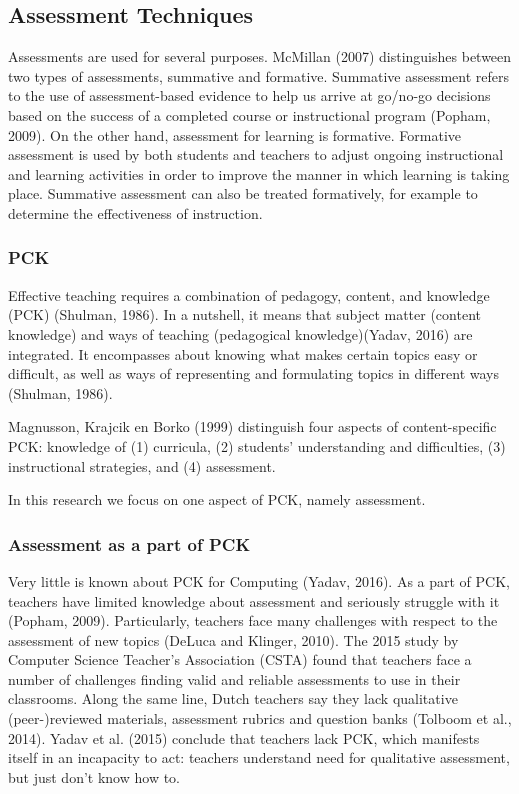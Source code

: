 \subsection{Assessment Techniques}
Assessments are used for several purposes. McMillan (2007) distinguishes between two types of assessments, summative and formative. Summative assessment refers to the use of assessment-based evidence to help us arrive at go/no-go decisions based on the success of a completed course or instructional program (Popham, 2009). On the other hand, assessment for learning is formative. Formative assessment is used by both students and teachers to adjust ongoing instructional and learning activities in order to improve the manner in which learning is taking place. Summative assessment can also be treated formatively, for example to determine the effectiveness of instruction.


\subsubsection*{PCK}

Effective teaching requires a combination of pedagogy, content, and knowledge (PCK) (Shulman, 1986). In a nutshell, it means that subject matter (content knowledge) and ways of teaching (pedagogical knowledge)(Yadav, 2016) are integrated. It encompasses about knowing what makes certain topics easy or difficult, as well as ways of representing and formulating topics in different ways (Shulman, 1986).

Magnusson, Krajcik en Borko (1999) distinguish four aspects of content-specific PCK: knowledge of
(1) curricula, (2) students' understanding and difficulties, (3) instructional strategies, and (4) assessment.


In this research we focus on one aspect of PCK, namely assessment. 


\subsubsection*{Assessment as a part of PCK}
Very little is known about PCK for Computing (Yadav, 2016). As a part of PCK, teachers have limited knowledge about assessment and seriously struggle with it (Popham, 2009). Particularly, teachers face many challenges with respect to the assessment of new topics (DeLuca and Klinger, 2010). The 2015 study by Computer Science Teacher's Association (CSTA) found that teachers face a number of challenges finding valid and reliable assessments to use in their classrooms. Along the same line, Dutch teachers say they lack qualitative (peer-)reviewed materials, assessment rubrics and question banks (Tolboom et al., 2014). Yadav et al. (2015) conclude that teachers lack PCK, which manifests itself in an incapacity to act: teachers understand need for qualitative assessment, but just don't know how to.


